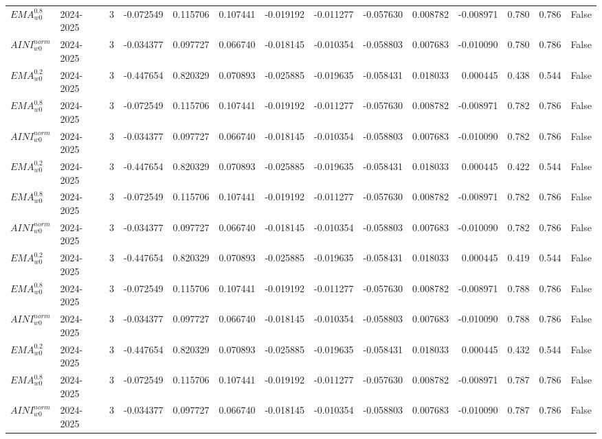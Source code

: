 \begin{tabular}{@{}llrrrrrrrrrlll@{}}
$EMA^{0.8}_{w0}$ & 2024-2025 & 3 & -0.072549 & 0.115706 & 0.107441 & -0.019192 & -0.011277 & -0.057630 & 0.008782 & -0.008971 & 0.780 & 0.786 & False \\
$AINI^{norm}_{w0}$ & 2024-2025 & 3 & -0.034377 & 0.097727 & 0.066740 & -0.018145 & -0.010354 & -0.058803 & 0.007683 & -0.010090 & 0.780 & 0.786 & False \\
$EMA^{0.2}_{w0}$ & 2024-2025 & 3 & -0.447654 & 0.820329 & 0.070893 & -0.025885 & -0.019635 & -0.058431 & 0.018033 & 0.000445 & 0.438 & 0.544 & False \\
$EMA^{0.8}_{w0}$ & 2024-2025 & 3 & -0.072549 & 0.115706 & 0.107441 & -0.019192 & -0.011277 & -0.057630 & 0.008782 & -0.008971 & 0.782 & 0.786 & False \\
$AINI^{norm}_{w0}$ & 2024-2025 & 3 & -0.034377 & 0.097727 & 0.066740 & -0.018145 & -0.010354 & -0.058803 & 0.007683 & -0.010090 & 0.782 & 0.786 & False \\
$EMA^{0.2}_{w0}$ & 2024-2025 & 3 & -0.447654 & 0.820329 & 0.070893 & -0.025885 & -0.019635 & -0.058431 & 0.018033 & 0.000445 & 0.422 & 0.544 & False \\
$EMA^{0.8}_{w0}$ & 2024-2025 & 3 & -0.072549 & 0.115706 & 0.107441 & -0.019192 & -0.011277 & -0.057630 & 0.008782 & -0.008971 & 0.782 & 0.786 & False \\
$AINI^{norm}_{w0}$ & 2024-2025 & 3 & -0.034377 & 0.097727 & 0.066740 & -0.018145 & -0.010354 & -0.058803 & 0.007683 & -0.010090 & 0.782 & 0.786 & False \\
$EMA^{0.2}_{w0}$ & 2024-2025 & 3 & -0.447654 & 0.820329 & 0.070893 & -0.025885 & -0.019635 & -0.058431 & 0.018033 & 0.000445 & 0.419 & 0.544 & False \\
$EMA^{0.8}_{w0}$ & 2024-2025 & 3 & -0.072549 & 0.115706 & 0.107441 & -0.019192 & -0.011277 & -0.057630 & 0.008782 & -0.008971 & 0.788 & 0.786 & False \\
$AINI^{norm}_{w0}$ & 2024-2025 & 3 & -0.034377 & 0.097727 & 0.066740 & -0.018145 & -0.010354 & -0.058803 & 0.007683 & -0.010090 & 0.788 & 0.786 & False \\
$EMA^{0.2}_{w0}$ & 2024-2025 & 3 & -0.447654 & 0.820329 & 0.070893 & -0.025885 & -0.019635 & -0.058431 & 0.018033 & 0.000445 & 0.432 & 0.544 & False \\
$EMA^{0.8}_{w0}$ & 2024-2025 & 3 & -0.072549 & 0.115706 & 0.107441 & -0.019192 & -0.011277 & -0.057630 & 0.008782 & -0.008971 & 0.787 & 0.786 & False \\
$AINI^{norm}_{w0}$ & 2024-2025 & 3 & -0.034377 & 0.097727 & 0.066740 & -0.018145 & -0.010354 & -0.058803 & 0.007683 & -0.010090 & 0.787 & 0.786 & False \\

\end{tabular}
